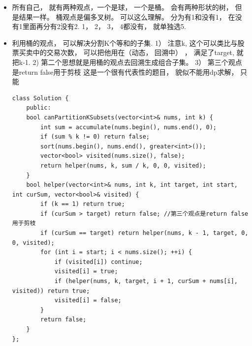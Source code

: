 \documentclass[a4paper,11pt,twoside]{book}
\begin{document}
\begin{itemize}
	\item 所有自己， 就有两种观点，一个是球， 一个是桶。 会有两种形状的树， 但是结果一样。  桶观点是偏多叉树。 可以这么理解。 分为有1和没有1， 在没有1里面再分有2没有2.  1， 2， 3， 4都没有， 就单独选5.  
	
	\item 利用桶的观点， 可以解决分割K个等和的子集. 1） 注意k, 这个可以类比与股票买卖中的交易次数， 可以把他用在（动态， 回溯中） ， 满足了target, 就把k-1. 2) 第二个思想就是用桶的观点去回溯生成组合子集。 3） 第三个观点是return false用于剪枝
	这是一个很有代表性的题目， 貌似不能用dp求解， 只能
\begin{lstlisting}
class Solution {
	public:
	bool canPartitionKSubsets(vector<int>& nums, int k) {
		int sum = accumulate(nums.begin(), nums.end(), 0);
		if (sum % k != 0) return false;
		sort(nums.begin(), nums.end(), greater<int>());
		vector<bool> visited(nums.size(), false);
		return helper(nums, k, sum / k, 0, 0, visited);
	}
	bool helper(vector<int>& nums, int k, int target, int start, int curSum, vector<bool>& visited) {
		if (k == 1) return true;
		if (curSum > target) return false; //第三个观点是return false用于剪枝
		if (curSum == target) return helper(nums, k - 1, target, 0, 0, visited);  
		for (int i = start; i < nums.size(); ++i) {
			if (visited[i]) continue;
			visited[i] = true;
			if (helper(nums, k, target, i + 1, curSum + nums[i], visited)) return true;
			visited[i] = false;
		}
		return false;
	}
};
\end{lstlisting}
	
	
\end{itemize}
\end{document}
